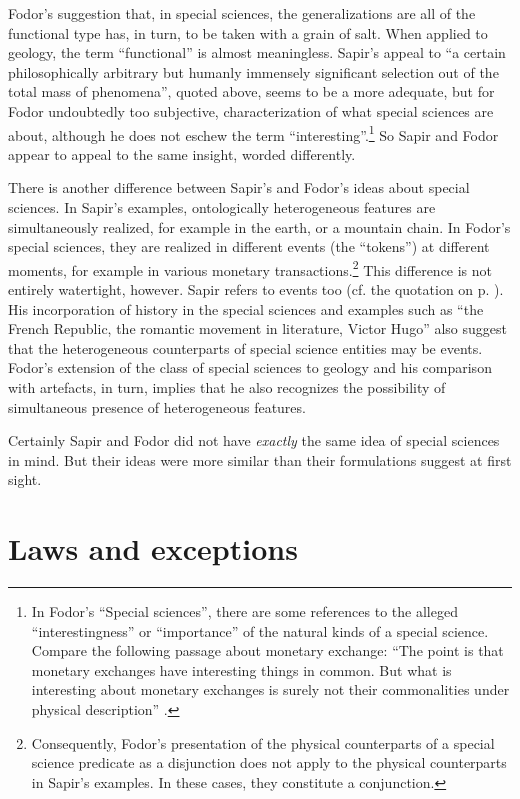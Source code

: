 \documentclass[output=paper]{langscibook}
\begin{document}
Fodor's suggestion that, in special sciences, the generalizations are all of the functional type has, in turn, to be taken with a grain of salt. When applied to geology, the term ``functional'' is almost meaningless. Sapir's appeal to ``a certain philosophically arbitrary but humanly immensely significant selection out of the total mass of phenomena'', quoted above, seems to be a more adequate, but for Fodor undoubtedly too subjective, characterization of what special sciences are about, although he does not eschew the term ``interesting''.\footnote{In Fodor's ``Special sciences'', there are some references to the alleged ``interestingness'' or ``importance'' of the natural kinds of a special science. Compare the following passage about monetary exchange: ``The point is that monetary exchanges have interesting things in common. But what is interesting about monetary exchanges is surely not their commonalities under physical description'' \citep[103-104]{Fodor1974}.} So Sapir and Fodor appear to appeal to the same insight, worded differently.

There is another difference between Sapir's and Fodor's ideas about special sciences. In Sapir's examples, ontologically heterogeneous features are simultaneously realized, for example in the earth, or a mountain chain. In Fodor's special sciences, they are realized in different events (the ``tokens'') at different moments, for example in various monetary transactions.\footnote{Consequently, Fodor's presentation of the physical counterparts of a special science predicate as a disjunction does not apply to the physical counterparts in Sapir's examples. In these cases, they constitute a conjunction.} This difference is not entirely watertight, however. Sapir refers to events too (cf. the quotation on p. \pageref{q:elffers:sapirquote}). His incorporation of history in the special sciences and examples such as ``the French Republic, the romantic movement in literature, Victor Hugo'' also suggest that the heterogeneous counterparts of special science entities may be events. Fodor's extension of the class of special sciences to geology and his comparison with artefacts, in turn, implies that he also recognizes the possibility of simultaneous presence of heterogeneous features.

Certainly Sapir and Fodor did not have \emph{exactly} the same idea of special sciences in mind. But their ideas were more similar than their formulations suggest at first sight.

\section{Laws and exceptions}
\label{sec:elffers:lawsexceptions}
\end{document}
